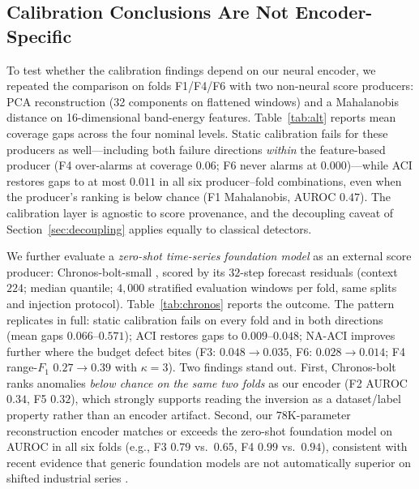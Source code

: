\subsection{Calibration Conclusions Are Not Encoder-Specific}
\label{sec:alt-scores}
To test whether the calibration findings depend on our neural encoder, we repeated the comparison on folds F1/F4/F6 with two non-neural score producers: PCA reconstruction (32 components on flattened windows) and a Mahalanobis distance on 16-dimensional band-energy features. Table~\ref{tab:alt} reports mean coverage gaps across the four nominal levels. Static calibration fails for these producers as well---including both failure directions \emph{within} the feature-based producer (F4 over-alarms at coverage $0.06$; F6 never alarms at $0.000$)---while ACI restores gaps to at most $0.011$ in all six producer--fold combinations, even when the producer's ranking is below chance (F1 Mahalanobis, AUROC $0.47$). The calibration layer is agnostic to score provenance, and the decoupling caveat of Section~\ref{sec:decoupling} applies equally to classical detectors.

We further evaluate a \emph{zero-shot time-series foundation model} as an external score producer: Chronos-bolt-small \cite{chronos2024}, scored by its $32$-step forecast residuals (context $224$; median quantile; $4{,}000$ stratified evaluation windows per fold, same splits and injection protocol). Table~\ref{tab:chronos} reports the outcome. The pattern replicates in full: static calibration fails on every fold and in both directions (mean gaps $0.066$--$0.571$); ACI restores gaps to $0.009$--$0.048$; NA-ACI improves further where the budget defect bites (F3: $0.048\!\to\!0.035$, F6: $0.028\!\to\!0.014$; F4 range-$F_1$ $0.27\!\to\!0.39$ with $\kappa{=}3$). Two findings stand out. First, Chronos-bolt ranks anomalies \emph{below chance on the same two folds} as our encoder (F2 AUROC $0.34$, F5 $0.32$), which strongly supports reading the inversion as a dataset/label property rather than an encoder artifact. Second, our $78$K-parameter reconstruction encoder matches or exceeds the zero-shot foundation model on AUROC in all six folds (e.g., F3 $0.79$ vs.\ $0.65$, F4 $0.99$ vs.\ $0.94$), consistent with recent evidence that generic foundation models are not automatically superior on shifted industrial series \cite{freqmatters2025,foundational2025}.

